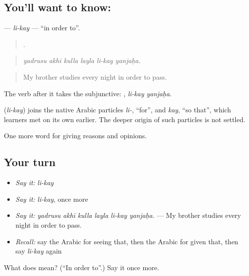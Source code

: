 \subsection*{You'll want to know: }
\textbf{} — \emph{li-kay} — \textquotedblleft{}in order to\textquotedblright{}.

\begin{quote}
     .
\end{quote}

\begin{quote}
\emph{yadrusu akhī kulla layla li-kay yanjaḥa.}
\end{quote}

\begin{quote}
My brother studies every night in order to pass.
\end{quote}

The verb after it takes the subjunctive:  , \emph{li-kay yanjaḥa}.

\begin{cousinweb}
\textbf{} (\emph{li-kay}) joins the native Arabic particles \emph{li-}, \textquotedblleft{}for\textquotedblright{}, and \emph{kay}, \textquotedblleft{}so that\textquotedblright{}, which learners met on its own earlier. The deeper origin of such particles is not settled.
\end{cousinweb}

\begin{grammarlens}[title={What you've built}]
One more word for giving reasons and opinions.
\end{grammarlens}

\subsection*{Your turn}
\begin{itemize}
\raggedright
  \item \emph{Say it:} \emph{li-kay}
  \item \emph{Say it:} \emph{li-kay}, once more
  \item \emph{Say it:} \emph{yadrusu akhī kulla layla li-kay yanjaḥa.} — My brother studies every night in order to pass.
  \item \emph{Recall:} say the Arabic for seeing that, then the Arabic for given that, then say \emph{li-kay} again
\end{itemize}

\begin{tcolorbox}[breakable,colback=teal!4,colframe=teal!35!black,title={Before you move on}]
What does  mean? (\textquotedblleft{}In order to\textquotedblright{}.) Say it once more.
\end{tcolorbox}
